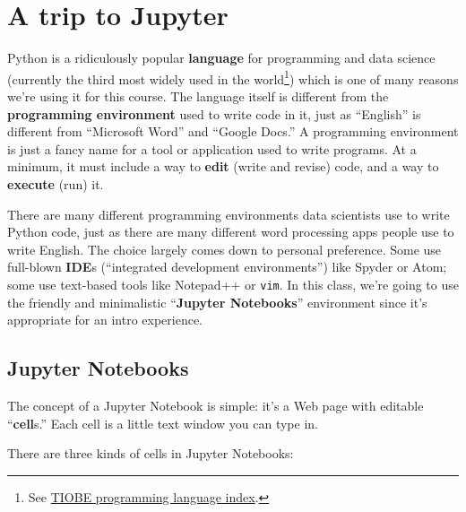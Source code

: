 
\chapter{A trip to Jupyter}

\label{programmingEnvironment}
Python is a ridiculously popular \textbf{language} for programming and data
science (currently the third most widely used in the world\footnote{See
\href{https://www.tiobe.com/tiobe-index/}{TIOBE programming language index}.}) which is one of many reasons we're
using it for this course. The language itself is different from the
\textbf{programming environment} used to write code in it, just as ``English''
is different from ``Microsoft Word'' and ``Google Docs.'' A programming
environment is just a fancy name for a tool or application used to write
programs. At a minimum, it must include a way to \textbf{edit} (write and
revise) code, and a way to \textbf{execute} (run) it.

There are many different programming environments data scientists use to write
Python code, just as there are many different word processing apps people use
to write English. The choice largely comes down to personal preference. Some
use full-blown \textbf{IDE}s (``integrated development environments'') like
Spyder or Atom; some use text-based tools like Notepad++ or \texttt{vim}. In
this class, we're going to use the friendly and minimalistic ``\textbf{Jupyter
Notebooks}'' environment since it's appropriate for an intro experience.

\section{Jupyter Notebooks}


The concept of a Jupyter Notebook is simple: it's a Web page with editable
``\textbf{cell}s.'' Each cell is a little text window you can type in.

\pagebreak
There are three kinds of cells in Jupyter Notebooks:
\vspace{-.15in}

